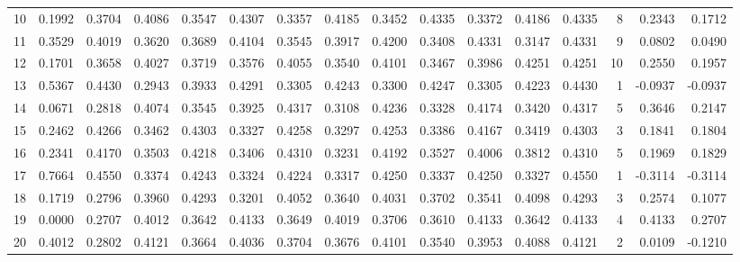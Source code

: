 \begin{tabular}{lrrrrrrrrrrrrrrr}
10  &      0.1992 &  0.3704 &  0.4086 &  0.3547 &  0.4307 &  0.3357 &  0.4185 &  0.3452 &  0.4335 &  0.3372 &   0.4186 &     0.4335 &      8 &                    0.2343 &                     0.1712 \\
11  &      0.3529 &  0.4019 &  0.3620 &  0.3689 &  0.4104 &  0.3545 &  0.3917 &  0.4200 &  0.3408 &  0.4331 &   0.3147 &     0.4331 &      9 &                    0.0802 &                     0.0490 \\
12  &      0.1701 &  0.3658 &  0.4027 &  0.3719 &  0.3576 &  0.4055 &  0.3540 &  0.4101 &  0.3467 &  0.3986 &   0.4251 &     0.4251 &     10 &                    0.2550 &                     0.1957 \\
13  &      0.5367 &  0.4430 &  0.2943 &  0.3933 &  0.4291 &  0.3305 &  0.4243 &  0.3300 &  0.4247 &  0.3305 &   0.4223 &     0.4430 &      1 &                   -0.0937 &                    -0.0937 \\
14  &      0.0671 &  0.2818 &  0.4074 &  0.3545 &  0.3925 &  0.4317 &  0.3108 &  0.4236 &  0.3328 &  0.4174 &   0.3420 &     0.4317 &      5 &                    0.3646 &                     0.2147 \\
15  &      0.2462 &  0.4266 &  0.3462 &  0.4303 &  0.3327 &  0.4258 &  0.3297 &  0.4253 &  0.3386 &  0.4167 &   0.3419 &     0.4303 &      3 &                    0.1841 &                     0.1804 \\
16  &      0.2341 &  0.4170 &  0.3503 &  0.4218 &  0.3406 &  0.4310 &  0.3231 &  0.4192 &  0.3527 &  0.4006 &   0.3812 &     0.4310 &      5 &                    0.1969 &                     0.1829 \\
17  &      0.7664 &  0.4550 &  0.3374 &  0.4243 &  0.3324 &  0.4224 &  0.3317 &  0.4250 &  0.3337 &  0.4250 &   0.3327 &     0.4550 &      1 &                   -0.3114 &                    -0.3114 \\
18  &      0.1719 &  0.2796 &  0.3960 &  0.4293 &  0.3201 &  0.4052 &  0.3640 &  0.4031 &  0.3702 &  0.3541 &   0.4098 &     0.4293 &      3 &                    0.2574 &                     0.1077 \\
19  &      0.0000 &  0.2707 &  0.4012 &  0.3642 &  0.4133 &  0.3649 &  0.4019 &  0.3706 &  0.3610 &  0.4133 &   0.3642 &     0.4133 &      4 &                    0.4133 &                     0.2707 \\
20  &      0.4012 &  0.2802 &  0.4121 &  0.3664 &  0.4036 &  0.3704 &  0.3676 &  0.4101 &  0.3540 &  0.3953 &   0.4088 &     0.4121 &      2 &                    0.0109 &                    -0.1210 \\

\end{tabular}
